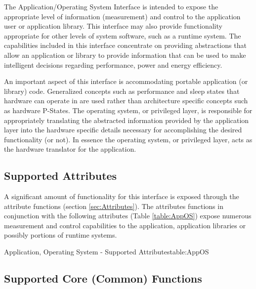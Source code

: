 The Application/Operating System Interface is intended to expose the appropriate level of information 
(measurement) and control to the application user or application library.
This interface may also provide functionality appropriate for other levels of system software, such as a runtime system.
The capabilities included in this interface concentrate on providing abstractions that allow an application or library to provide information
that can be used to make intelligent decisions regarding performance, power and energy efficiency.

An important aspect of this interface is accommodating portable application (or library) code.
Generalized concepts such as performance and sleep states that hardware can operate in are used rather than architecture specific concepts such as hardware P-States. 
The operating system, or privileged layer, is responsible for appropriately translating the abstracted information provided by the application layer into the hardware specific details necessary for accomplishing the desired functionality (or not).
In essence the operating system, or privileged layer, acts as the hardware translator for the application.

\subsection{Supported Attributes}\label{sec:AppOSAttributes}
A significant amount of functionality for this interface is exposed through the attribute functions (section \ref{sec:Attributes}).
The attributes functions in conjunction with the following attributes (Table \ref{table:AppOS}) expose numerous measurement and control capabilities to the application, application libraries or possibly portions of runtime systems.

\begin{attributetable}{Application, Operating System - Supported Attributes}{table:AppOS}
\aPowerDesc
\aMinPowerDesc
\aMaxPowerDesc
\aFreqDesc
\aFreqLimitMinDesc
\aFreqLimitMaxDesc
\aEnergyDesc
\aTempDesc
\aOSIdDesc
\aGovDesc
\end{attributetable}

\subsection{Supported Core (Common) Functions}\label{sec:AppOSSupportedCommon}

